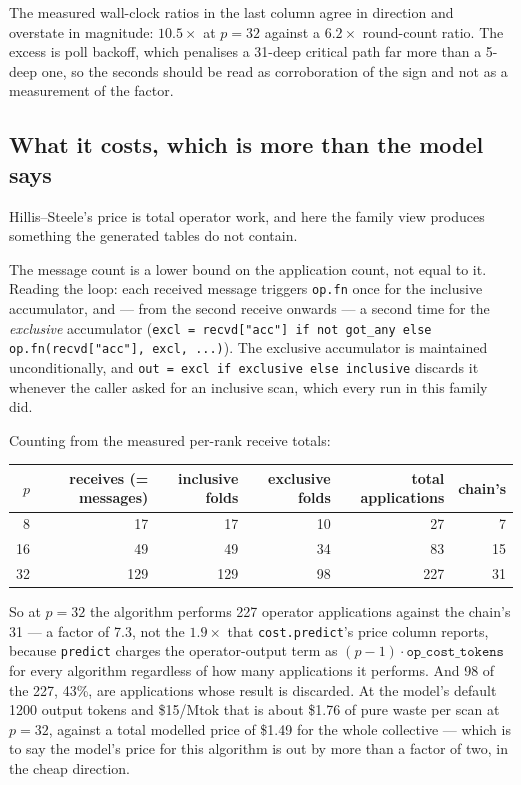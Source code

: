 \documentclass[11pt]{article}
\begin{document}
The measured wall-clock ratios in the last column agree in direction and overstate in magnitude:
$10.5\times$ at $p=32$ against a $6.2\times$ round-count ratio. The excess is poll backoff, which
penalises a 31-deep critical path far more than a 5-deep one, so the seconds should be read as
corroboration of the sign and not as a measurement of the factor.

\subsection{What it costs, which is more than the model says}

Hillis--Steele's price is total operator work, and here the family view produces something the
generated tables do not contain.

The message count is a lower bound on the application count, not equal to it. Reading the loop:
each received message triggers \texttt{op.fn} once for the inclusive accumulator, and --- from the
second receive onwards --- a second time for the \emph{exclusive} accumulator
(\texttt{excl = recvd["acc"] if not got\_any else op.fn(recvd["acc"], excl, ...)}). The exclusive
accumulator is maintained unconditionally, and \texttt{out = excl if exclusive else inclusive}
discards it whenever the caller asked for an inclusive scan, which every run in this family did.

Counting from the measured per-rank receive totals:

\begin{center}\footnotesize
\begin{tabular}{@{}rrrrrr@{}}
\toprule
  $p$ & receives (= messages) & inclusive folds & exclusive folds & total applications & chain's \\
\midrule
  8  & 17  & 17  & 10 & 27  & 7  \\
  16 & 49  & 49  & 34 & 83  & 15 \\
  32 & 129 & 129 & 98 & 227 & 31 \\
\bottomrule
\end{tabular}\normalsize
\end{center}

\noindent
So at $p=32$ the algorithm performs 227 operator applications against the chain's 31 --- a factor
of 7.3, not the $1.9\times$ that \texttt{cost.predict}'s price column reports, because
\texttt{predict} charges the operator-output term as $(p-1) \cdot \texttt{op\_cost\_tokens}$ for
every algorithm regardless of how many applications it performs. And 98 of the 227, 43\%, are
applications whose result is discarded. At the model's default 1200 output tokens and
\$15/Mtok that is about \$1.76 of pure waste per scan at $p=32$, against a total modelled price of
\$1.49 for the whole collective --- which is to say the model's price for this algorithm is out by
more than a factor of two, in the cheap direction.
\end{document}
